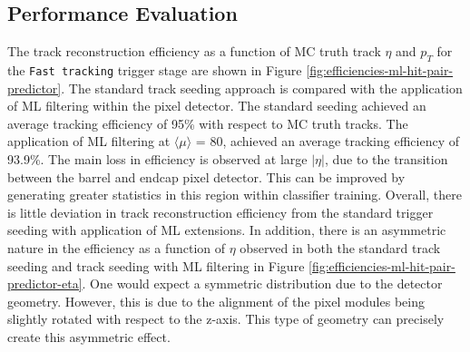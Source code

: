 



\subsection{Performance Evaluation}

The track reconstruction efficiency as a function of MC truth track $\eta$ and $p_T$ for the \texttt{Fast tracking} trigger stage are shown in Figure \ref{fig:efficiencies-ml-hit-pair-predictor}. The standard track seeding approach is compared with the application of ML filtering within the pixel detector. The standard seeding achieved an average tracking efficiency of 95\% with respect to MC truth tracks. The application of ML filtering at $\langle \mu \rangle$ = 80, achieved an average tracking efficiency of 93.9\%. The main loss in efficiency is observed at large $\lvert \eta \rvert$, due to the transition between the barrel and endcap pixel detector. This can be improved by generating greater statistics in this region within classifier training. Overall, there is little deviation in track reconstruction efficiency from the standard trigger seeding with application of ML extensions. In addition, there is an asymmetric nature in the efficiency as a function of $\eta$ observed in both the standard track seeding and track seeding with ML filtering in Figure \ref{fig:efficiencies-ml-hit-pair-predictor-eta}. One would expect a symmetric distribution due to the detector geometry. However, this is due to the alignment of the pixel modules being slightly rotated with respect to the z-axis. This type of geometry can precisely create this asymmetric effect.



